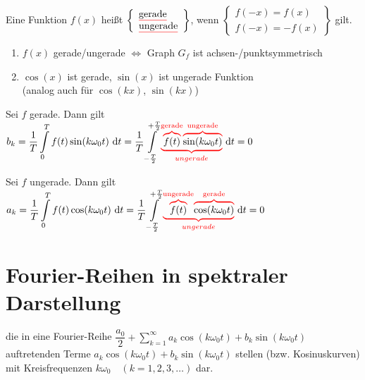 \Def Eine Funktion $f(x)$ heißt $\left\{\begin{array}{l}\text{\textcolor{red}{\underline{\textcolor{black}{gerade}}}}\\\text{\textcolor{red}{\underline{\textcolor{black}{ungerade}}}}\end{array}\right\}$, wenn $\left\{\begin{array}{l}f(-x)=f(x)\\f(-x)=-f(x)\end{array}\right\}$ gilt.

\Bem\quad
\begin{enumerate}
	\item $f(x)$ gerade/ungerade $\Leftrightarrow$ Graph $G_f$ ist achsen-/punktsymmetrisch
	
	\item $\cos(x)$ ist gerade, $\sin(x)$ ist ungerade Funktion\\
	(analog auch für $\cos(kx)$, $\sin(kx)$)
\end{enumerate}


\Beweis Sei $f$ gerade. Dann gilt\\
\hhspace{2cm}$b_k=\dfrac{1}{T}\ds\int\limits_{0}^{T}f(t)\sin(k\omega_0t)\ds\intd{t}=\dfrac{1}{T}\ds\int\limits_{-\frac{T}{2}}^{+\frac{T}{2}}\redunderbrace{\redoverbrace{f(t)}{\text{gerade}}\redoverbrace{\sin(k\omega_0t)}{\text{ungerade}}}{ungerade}\intd{t}=0$

\Beweis Sei $f$ ungerade. Dann gilt\\
\hhspace{2cm}$a_k=\dfrac{1}{T}\ds\int\limits_{0}^{T}f(t)\cos(k\omega_0t)\ds\intd{t}=\dfrac{1}{T}\ds\int\limits_{-\frac{T}{2}}^{+\frac{T}{2}}\redunderbrace{\redoverbrace{f(t)}{\text{ungerade}}\redoverbrace{\cos(k\omega_0t)}{\text{gerade}}}{ungerade}\intd{t}=0$

\section{Fourier-Reihen in spektraler Darstellung}
die in eine Fourier-Reihe $\dfrac{a_0}{2}+\sum\limits_{k=1}^{\infty}a_k\cos(k\omega_0t)+b_k\sin(k\omega_0t)$ auftretenden Terme $a_k\cos(k\omega_0t)+b_k\sin(k\omega_0t)$ stellen  (bzw. Kosinuskurven) mit Kreisfrequenzen $k\omega_0\quad(k=1,2,3,\ldots)$ dar.
\imgplaceholder

